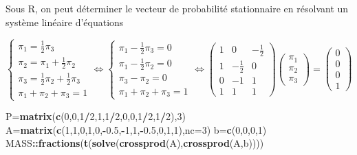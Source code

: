\documentclass[
]{book}
\newenvironment{Shaded}{\begin{snugshade}}{\end{snugshade}}
\newcommand{\DataTypeTok}[1]{\textcolor[rgb]{0.13,0.29,0.53}{#1}}
\newcommand{\DecValTok}[1]{\textcolor[rgb]{0.00,0.00,0.81}{#1}}
\newcommand{\FloatTok}[1]{\textcolor[rgb]{0.00,0.00,0.81}{#1}}
\newcommand{\KeywordTok}[1]{\textcolor[rgb]{0.13,0.29,0.53}{\textbf{#1}}}
\newcommand{\NormalTok}[1]{#1}
\newcommand{\OperatorTok}[1]{\textcolor[rgb]{0.81,0.36,0.00}{\textbf{#1}}}
\theoremstyle{definition}
\theoremstyle{definition}
\theoremstyle{definition}
\theoremstyle{remark}
\begin{document}
Sous R, on peut déterminer le vecteur de probabilité stationnaire en résolvant un système linéaire d'équations

\[ \left\{\begin{array}{l}
\pi_1 =\frac{1}{2}\pi_3\\
\pi_2 =\pi_1+\frac{1}{2}\pi_2\\
\pi_3 =\frac{1}{2}\pi_2+\frac{1}{2}\pi_3\\
\pi_1+\pi_2+\pi_3=1
\end{array}
\right. \Longleftrightarrow \left\{\begin{array}{l}
\pi_1 -\frac{1}{2}\pi_3=0\\
\pi_1-\frac{1}{2}\pi_2=0\\
\pi_3 -\pi_2=0\\
\pi_1+\pi_2+\pi_3=1
\end{array}
\right. \Longleftrightarrow 
\left(
\begin{array}{ccc}
1 & 0 &-\frac{1}{2}\\
1 & -\frac{1}{2} & 0\\
0& -1 & 1\\
1 & 1 & 1
\end{array}\right)\left(
\begin{array}{c}
\pi_1\\
 \pi_2\\
\pi_3
\end{array}\right)
=
\left(
\begin{array}{c}
0\\
 0\\
0\\
1 
\end{array}\right)\]

\begin{Shaded}
\begin{Highlighting}[]
\NormalTok{P=}\KeywordTok{matrix}\NormalTok{(}\KeywordTok{c}\NormalTok{(}\DecValTok{0}\NormalTok{,}\DecValTok{0}\NormalTok{,}\DecValTok{1}\OperatorTok{/}\DecValTok{2}\NormalTok{,}\DecValTok{1}\NormalTok{,}\DecValTok{1}\OperatorTok{/}\DecValTok{2}\NormalTok{,}\DecValTok{0}\NormalTok{,}\DecValTok{0}\NormalTok{,}\DecValTok{1}\OperatorTok{/}\DecValTok{2}\NormalTok{,}\DecValTok{1}\OperatorTok{/}\DecValTok{2}\NormalTok{),}\DecValTok{3}\NormalTok{)}
\NormalTok{A=}\KeywordTok{matrix}\NormalTok{(}\KeywordTok{c}\NormalTok{(}\DecValTok{1}\NormalTok{,}\DecValTok{1}\NormalTok{,}\DecValTok{0}\NormalTok{,}\DecValTok{1}\NormalTok{,}\DecValTok{0}\NormalTok{,}\OperatorTok{-}\FloatTok{0.5}\NormalTok{,}\OperatorTok{-}\DecValTok{1}\NormalTok{,}\DecValTok{1}\NormalTok{,}\OperatorTok{-}\FloatTok{0.5}\NormalTok{,}\DecValTok{0}\NormalTok{,}\DecValTok{1}\NormalTok{,}\DecValTok{1}\NormalTok{),}\DataTypeTok{nc=}\DecValTok{3}\NormalTok{)}
\NormalTok{b=}\KeywordTok{c}\NormalTok{(}\DecValTok{0}\NormalTok{,}\DecValTok{0}\NormalTok{,}\DecValTok{0}\NormalTok{,}\DecValTok{1}\NormalTok{)}
\NormalTok{MASS}\OperatorTok{::}\KeywordTok{fractions}\NormalTok{(}\KeywordTok{t}\NormalTok{(}\KeywordTok{solve}\NormalTok{(}\KeywordTok{crossprod}\NormalTok{(A),}\KeywordTok{crossprod}\NormalTok{(A,b))))}
\end{Highlighting}
\end{Shaded}
\end{document}

